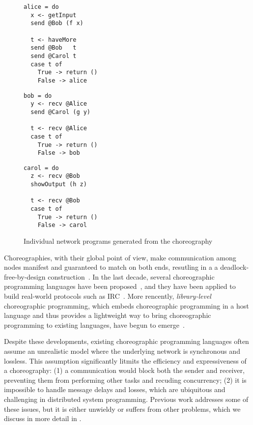 \begin{figure}[t]
\hspace{1cm}
\begin{minipage}[t]{0.3\textwidth}
\begin{verbatim}
alice = do
  x <- getInput
  send @Bob (f x)

  t <- haveMore
  send @Bob   t 
  send @Carol t
  case t of
    True -> return ()
    False -> alice
\end{verbatim}
\end{minipage}
\begin{minipage}[t]{0.3\textwidth}
\begin{verbatim}
bob = do
  y <- recv @Alice
  send @Carol (g y)

  t <- recv @Alice 
  case t of 
    True -> return ()
    False -> bob
\end{verbatim}
\end{minipage}
\begin{minipage}[t]{0.3\textwidth}
\begin{verbatim}
carol = do
  z <- recv @Bob
  showOutput (h z)

  t <- recv @Bob
  case t of
    True -> return ()
    False -> carol
\end{verbatim}
\end{minipage}
\caption{Individual network programs generated from the  choreography}
\label{fig:pipeline-epp}
\end{figure}

Choreographies, with their global point of view, make communication among nodes manifest and guaranteed to match on both ends, resutling in a a deadlock-free-by-design construction~\citep{deadlock-free-by-design}.
%
In the last decade, several choreographic programming languages have been proposed~\citep{aiocj, choral, pirouette, CC, chor-lambda}, and they have been applied to build real-world protocols such as IRC~\citep{irc}.
%
More rencently, \emph{library-level} choreographic programming, which embeds choreographic programming in a host language and thus provides a lightweight way to bring choreographic programming to existing languages, have begun to emerge~\citep{haschor, chorus}.

Despite these developments, existing choreographic programming languages often assume an unrealistic model where the underlying network is synchronous and lossless.
%
This assumption significantly litmits the efficiency and expressiveness of a choreography:
%
(1) a communication would block both the sender and receiver, preventing them from performing other tasks and recuding concurrency;
%
(2) it is impossible to handle message delays and losses, which are ubiquitous and challenging in distributed system programming.
%
Previous work addresses some of these issues, but it is either unwieldy or suffers from other problems, which we discuss in more detail in .

